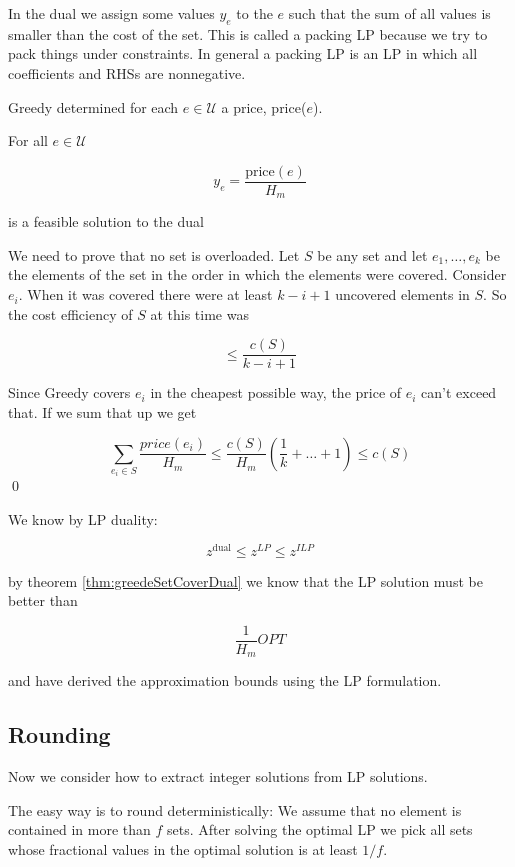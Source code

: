 In the dual we assign some values $y_e$ to the $e$ such that the sum of all values is smaller than the cost of the set. This is called a packing LP because we try to pack things under constraints. In general a packing LP is an LP in which all coefficients and RHSs are nonnegative.

\begin{thm} \label{thm:greedySetCoverDual}Greedy determined for each $e\in \mathcal{U}$ a price, price($e$).

For all $e\in \mathcal{U}$

\[y_e= \frac{\text{price}(e)}{H_m}\]

is a feasible solution to the dual
\end{thm}

\begin{pr} We need to prove that no set is overloaded. Let $S$ be any set and let $e_1,\ldots, e_k$ be the elements of the set in the order in which the elements were covered. Consider $e_i$. When it was covered there were at least $k-i+1$ uncovered elements in $S$. So the cost efficiency of $S$ at this time was 

\[\leq \frac{c(S)}{k-i+1}\]

Since Greedy covers $e_i$ in the cheapest possible way, the price of $e_i$ can't exceed that. If we sum that up we get

\[\sum_{e_i\in S} \frac{price(e_i)}{H_m} \leq \frac{c(S)}{H_m}\left(\frac{1}{k}+\ldots+1\right) \leq c(S)\]
\qed \end{pr}

We know by LP duality:

\[z^{\text{dual}} \leq z^{LP} \leq z^{ILP}\]

by theorem \ref{thm:greedeSetCoverDual} we know that the LP solution must be better than 

\[\frac{1}{H_m} OPT\]

and have derived the approximation bounds using the LP formulation.

\subsection{Rounding}

Now we consider how to extract integer solutions from LP solutions.

The easy way is to round deterministically: We assume that no element is contained in more than $f$ sets. After solving the optimal LP we pick all sets whose fractional values in the optimal solution is at least $1/f$. 

